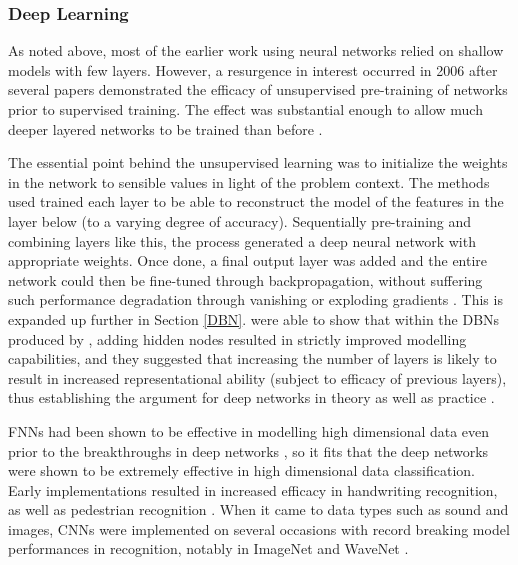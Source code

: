 \documentclass[a4paper,11pt,oneside]{article}
\theoremstyle{plain}
\theoremstyle{definition}
\begin{document}
	\subsubsection{Deep Learning}
	
	As noted above, most of the earlier work using neural networks relied on shallow models with few layers. 
	However, a resurgence in interest occurred in 2006 after several papers demonstrated the efficacy of 
	unsupervised pre-training of networks prior to supervised training. The effect was substantial enough to allow 
	much deeper layered networks to be trained than before \citep{Bengio1, Hinton1}.
	\hfill \break 
	
	The essential point behind the unsupervised learning was to initialize the weights in the network to sensible 
	values in light of the problem context. The methods used trained each layer to be able to reconstruct the model 
	of the features in the layer below (to a varying degree of accuracy). Sequentially pre-training and combining 
	layers like this, the process generated a deep neural network with appropriate weights. Once done, a final output 
	layer was added and the entire network could then be fine-tuned through backpropagation, without suffering 
	such performance degradation through vanishing or exploding gradients \citep{Hinton1, Ranzato1, Hinton2}. This is 
	expanded up further in Section \ref{DBN}. \citet{LeRoux} were able to show that within the DBNs produced by 
	\citet{Hinton1}, adding hidden nodes resulted in strictly improved modelling capabilities, and they suggested 
	that increasing the number of layers is likely to result in increased representational ability (subject to efficacy of 
	previous layers), thus establishing the argument for deep networks in theory as well as practice .
	\hfill \break 
	
	FNNs had been shown to be effective in modelling high dimensional data even prior to the breakthroughs in 
	deep networks \citep{Bengio2}, so it fits that the deep networks were shown to be extremely effective in high dimensional 
	data classification. Early implementations resulted in increased efficacy in handwriting recognition, as well as pedestrian 
	recognition \citep{Sermanet}. When it came to data types such as sound and images, CNNs were implemented on several 
	occasions with record breaking model performances in recognition, notably in ImageNet and WaveNet \citep{ImageNet, WaveNet}.
	\hfill \break 
	
\end{document}
